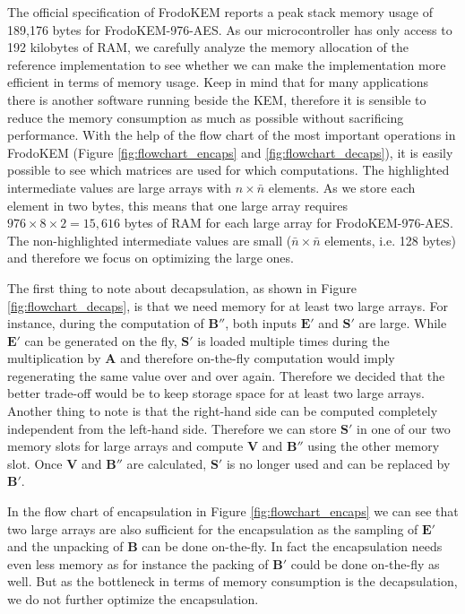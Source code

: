 The official specification of \textsf{FrodoKEM} reports a peak stack memory usage of 189,176 bytes for \textsf{FrodoKEM-976-AES}. As our microcontroller has only access to 192 kilobytes of RAM, we carefully analyze the memory allocation of the reference implementation to see whether we can make the implementation more efficient in terms of memory usage. Keep in mind that for many applications there is another software running beside the KEM, therefore it is sensible to reduce the memory consumption as much as possible without sacrificing performance. With the help of the flow chart of the most important operations in \textsf{FrodoKEM} (Figure \ref{fig:flowchart_encaps} and \ref{fig:flowchart_decaps}), it is easily possible to see which matrices are used for which computations. The highlighted intermediate values are large arrays with $n \times \bar{n}$ elements. As we store each element in two bytes, this means that one large array requires $976 \times 8 \times 2 = 15,616$ bytes of RAM for each large array for \textsf{FrodoKEM-976-AES}. The non-highlighted intermediate values are small ($\bar{n} \times \bar{n}$ elements, i.e. 128 bytes) and therefore we focus on optimizing the large ones. 

The first thing to note about decapsulation, as shown in Figure \ref{fig:flowchart_decaps}, is that we need memory for at least two large arrays. For instance, during the computation of $\mathbf{B}''$, both inputs $\mathbf{E'}$ and $\mathbf{S'}$ are large. While $\mathbf{E'}$ can be generated on the fly, $\mathbf{S'}$ is loaded multiple times during the multiplication by $\mathbf{A}$ and therefore on-the-fly computation would imply regenerating the same value over and over again. Therefore we decided that the better trade-off would be to keep storage space for at least two large arrays. Another thing to note is that the right-hand side can be computed completely independent from the left-hand side. Therefore we can store $\mathbf{S'}$ in one of our two memory slots for large arrays and compute $\mathbf{V}$ and $\mathbf{B''}$ using the other memory slot. Once $\mathbf{V}$ and $\mathbf{B''}$ are calculated, $\mathbf{S'}$ is no longer used and can be replaced by $\mathbf{B'}$.

In the flow chart of encapsulation in Figure \ref{fig:flowchart_encaps} we can see that two large arrays are also sufficient for the encapsulation as the sampling of $\mathbf{E'}$ and the unpacking of $\mathbf{B}$ can be done on-the-fly. In fact the encapsulation needs even less memory as for instance the packing of $\mathbf{B'}$ could be done on-the-fly as well. But as the bottleneck in terms of memory consumption is the decapsulation, we do not further optimize the encapsulation.


